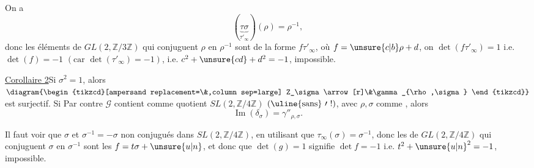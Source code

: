 On a
\[
(\underbrace{\tau\sigma}_{\tau'_\infty})(\rho)=\rho^{-1},
\]
donc
 les éléments de
$GL(2,\mathbb{Z}/3\mathbb{Z})$
qui conjuguent $\rho$ en $\rho^{-1}$ sont de la forme
$f\tau'_\infty$, où
$f=\unsure{c|b}\rho+d$, on 
$\det(f\tau'_\infty)=1$ i.e. $\det(f)=-1$
$(\text{car }\det(\tau'_\infty)=-1)$,
i.e. $c^2+\unsure{cd}+d^2=-1$, impossible.



\uline{Corollaire 2}\quad Si $\sigma^2=1$, alors
$\diagram{\begin{tikzcd}[ampersand replacement=\&,column sep=large]
Z_\sigma\arrow[r]\&\gamma_{\rho,\sigma}
\end{tikzcd}}$
est surjectif. Si Par contre $\mathcal{G}$ contient comme quotient
$SL(2,\mathbb{Z}/4\mathbb{Z})$
$(\uline{\text{sans}}\ \prime\ !)$, avec $\rho,\sigma$ comme
, alors
\[
\operatorname{Im}(\delta_\sigma)=\gamma''_{\rho,\sigma}.
\]

Il faut voir que $\sigma$ et $\sigma^{-1}=-\sigma$ non conjugués
dans $SL(2,\mathbb{Z}/4\mathbb{Z})$, en utilisant que
$\tau_\infty(\sigma)=\sigma^{-1}$, donc
les  de $GL(2,\mathbb{Z}/4\mathbb{Z})$ qui
conjuguent $\sigma$ en $\sigma^{-1}$ sont les
$f=t\sigma+\unsure{u|n}$,
et donc que $\det(g)=1$ signifie $\det f=-1$
i.e. $t^2+\unsure{u|n}^2=-1$, impossible.


